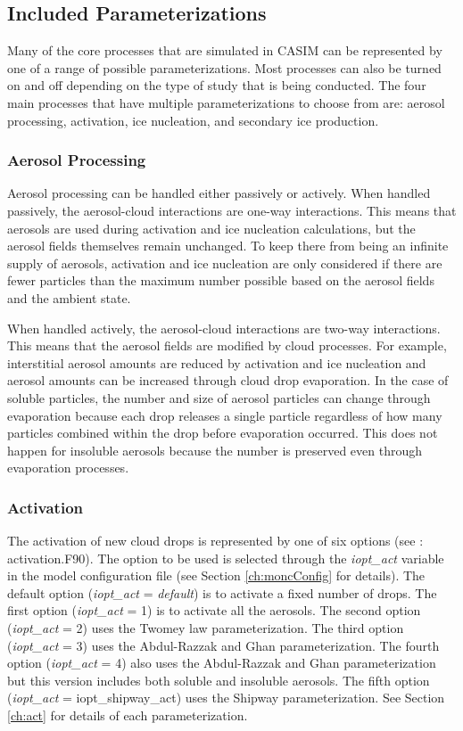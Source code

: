 \subsection{Included Parameterizations}
Many of the core processes that are simulated in CASIM can be represented by one of a range of possible parameterizations. Most processes can also be turned on and off depending on the type of study that is being conducted. The four main processes that have multiple parameterizations to choose from are: aerosol processing, activation, ice nucleation, and secondary ice production.

\subsubsection{Aerosol Processing}
Aerosol processing can be handled either passively or actively. When handled passively, the aerosol-cloud interactions are one-way interactions. This means that aerosols are used during activation and ice nucleation calculations, but the aerosol fields themselves remain unchanged. To keep there from being an infinite supply of aerosols, activation and ice nucleation are only considered if there are fewer particles than the maximum number possible based on the aerosol fields and the ambient state. \citep{milt2018-1,casimCode}

When handled actively, the aerosol-cloud interactions are two-way interactions. This means that the aerosol fields are modified by cloud processes. For example, interstitial aerosol amounts are reduced by activation and ice nucleation and aerosol amounts can be increased through cloud drop evaporation. In the case of soluble particles, the number and size of aerosol particles can change through evaporation because each drop releases a single particle regardless of how many particles combined within the drop before evaporation occurred. This does not happen for insoluble aerosols because the number is preserved even through evaporation processes. \citep{milt2018-1}

\subsubsection{Activation}
The activation of new cloud drops is represented by one of six options (see \cite{casimCode}: activation.F90). The option to be used is selected through the \textit{iopt\_act} variable in the model configuration file (see Section \ref{ch:moncConfig} for details). The default option (\textit{iopt\_act} = \textit{default}) is to activate a fixed number of drops. The first option (\textit{iopt\_act} = 1) is to activate all the aerosols. The second option (\textit{iopt\_act} = 2) uses the Twomey law parameterization. The third option (\textit{iopt\_act} = 3) uses the Abdul-Razzak and Ghan parameterization. The fourth option (\textit{iopt\_act} = 4) also uses the Abdul-Razzak and Ghan parameterization but this version includes both soluble and insoluble aerosols. The fifth option (\textit{iopt\_act} = iopt\_shipway\_act) uses the Shipway parameterization. See Section \ref{ch:act} for details of each parameterization.

